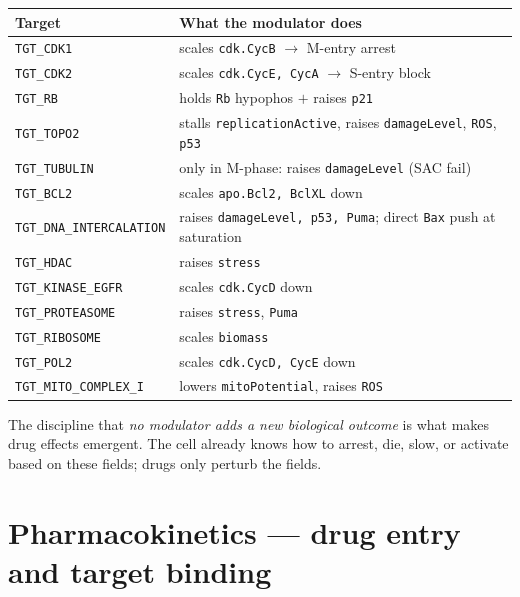 \documentclass[11pt,letterpaper,twoside,openany]{book}
\newcommand{\code}[1]{\texttt{#1}}
\begin{document}
\begin{center}
\begin{tabular}{ll}
\toprule
Target & What the modulator does\\ \midrule
\code{TGT\_CDK1}   & scales \code{cdk.CycB} $\to$ M-entry arrest\\
\code{TGT\_CDK2}   & scales \code{cdk.CycE, CycA} $\to$ S-entry block\\
\code{TGT\_RB}     & holds \code{Rb} hypophos $+$ raises \code{p21}\\
\code{TGT\_TOPO2}  & stalls \code{replicationActive}, raises \code{damageLevel}, \code{ROS}, \code{p53}\\
\code{TGT\_TUBULIN}& only in M-phase: raises \code{damageLevel} (SAC fail)\\
\code{TGT\_BCL2}   & scales \code{apo.Bcl2, BclXL} down\\
\code{TGT\_DNA\_INTERCALATION} & raises \code{damageLevel, p53, Puma}; direct \code{Bax} push at saturation\\
\code{TGT\_HDAC}   & raises \code{stress}\\
\code{TGT\_KINASE\_EGFR} & scales \code{cdk.CycD} down\\
\code{TGT\_PROTEASOME} & raises \code{stress}, \code{Puma}\\
\code{TGT\_RIBOSOME} & scales \code{biomass}\\
\code{TGT\_POL2}    & scales \code{cdk.CycD, CycE} down\\
\code{TGT\_MITO\_COMPLEX\_I} & lowers \code{mitoPotential}, raises \code{ROS}\\
\bottomrule
\end{tabular}
\end{center}

The discipline that \emph{no modulator adds a new biological
outcome} is what makes drug effects emergent. The cell already
knows how to arrest, die, slow, or activate based on these fields;
drugs only perturb the fields.

\chapter{Pharmacokinetics --- drug entry and target binding}
\label{ch:pk}
\end{document}
